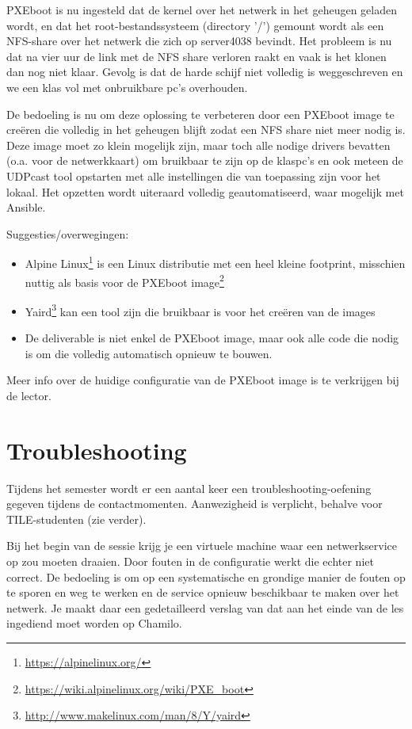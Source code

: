 PXEboot is nu ingesteld dat de kernel over het netwerk in het geheugen geladen wordt, en dat het root-bestandssysteem (directory '/') gemount wordt als een NFS-share over het netwerk die zich op server4038 bevindt. Het probleem is nu dat na vier uur de link met de NFS share verloren raakt en vaak is het klonen dan nog niet klaar. Gevolg is dat de harde schijf niet volledig is weggeschreven en we een klas vol met onbruikbare pc's overhouden.

De bedoeling is nu om deze oplossing te verbeteren door een PXEboot image te creëren die volledig in het geheugen blijft zodat een NFS share niet meer nodig is. Deze image moet zo klein mogelijk zijn, maar toch alle nodige drivers bevatten (o.a. voor de netwerkkaart) om bruikbaar te zijn op de klaspc's en ook meteen de UDPcast tool opstarten met alle instellingen die van toepassing zijn voor het lokaal. Het opzetten wordt uiteraard volledig geautomatiseerd, waar mogelijk met Ansible.

Suggesties/overwegingen:

\begin{itemize}
\item Alpine Linux\footnote{\url{https://alpinelinux.org/}} is een Linux distributie met een heel kleine footprint, misschien nuttig als basis voor de PXEboot image\footnote{\url{https://wiki.alpinelinux.org/wiki/PXE_boot}}
\item Yaird\footnote{\url{http://www.makelinux.com/man/8/Y/yaird}} kan een tool zijn die bruikbaar is voor het creëren van de images
\item De deliverable is niet enkel de PXEboot image, maar ook alle code die nodig is om die volledig automatisch opnieuw te bouwen.
\end{itemize}

Meer info over de huidige configuratie van de PXEboot image is te verkrijgen bij de lector.

\section{Troubleshooting}
\label{troubleshooting}

Tijdens het semester wordt er een aantal keer een troubleshooting-oefening gegeven tijdens de contactmomenten. Aanwezigheid is verplicht, behalve voor TILE-studenten (zie verder).

Bij het begin van de sessie krijg je een virtuele machine waar een netwerkservice op zou moeten draaien. Door fouten in de configuratie werkt die echter niet correct. De bedoeling is om op een systematische en grondige manier de fouten op te sporen en weg te werken en de service opnieuw beschikbaar te maken over het netwerk. Je maakt daar een gedetailleerd verslag van dat aan het einde van de les ingediend moet worden op Chamilo.

